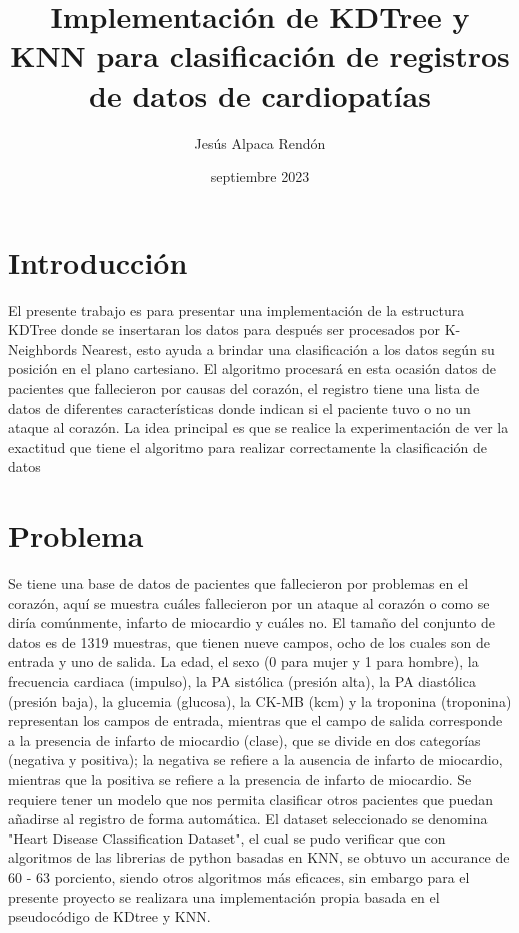 \documentclass[12pt]{article} %
\title{Implementación de KDTree y KNN para clasificación de registros de datos de cardiopatías}
\date{septiembre 2023}
\author{Jesús Alpaca Rendón}
\begin{document}
\maketitle
\section{Introducción}

El presente trabajo es para presentar una implementación de la estructura KDTree donde se insertaran los datos para después ser procesados
por K-Neighbords Nearest, esto ayuda a brindar una clasificación a los datos según su posición en el plano cartesiano. El algoritmo procesará
en esta ocasión datos de pacientes que fallecieron por causas del corazón, el registro tiene una lista de datos de diferentes características
donde indican si el paciente tuvo o no un ataque al corazón.
La idea principal es que se realice la experimentación de ver la exactitud que tiene el algoritmo para realizar correctamente la clasificación de datos

\section{Problema}

Se tiene una base de datos de pacientes que fallecieron por problemas en el corazón, aquí se muestra cuáles fallecieron por un ataque al corazón o como se diría comúnmente, infarto de miocardio y cuáles no.
El tamaño del conjunto de datos es de 1319 muestras, que tienen nueve campos, ocho de los cuales son de entrada y uno de salida. La edad,
el sexo (0 para mujer y 1 para hombre), la frecuencia cardiaca (impulso), la PA sistólica (presión alta), la PA diastólica (presión baja),
la glucemia (glucosa), la CK-MB (kcm) y la troponina (troponina) representan los campos de entrada, mientras que el campo de salida corresponde a la presencia
de infarto de miocardio (clase), que se divide en dos categorías (negativa y positiva); la negativa se refiere a la ausencia de infarto de miocardio, mientras que la positiva se refiere a la presencia de infarto de miocardio.
Se requiere tener un modelo que nos permita clasificar otros pacientes que puedan añadirse al registro de forma automática.
El dataset seleccionado se denomina "Heart Disease Classification Dataset", el cual se pudo verificar que con algoritmos de las librerias de python basadas en KNN, se obtuvo un accurance de 60 - 63 porciento, siendo otros algoritmos
más eficaces, sin embargo para el presente proyecto se realizara una implementación propia basada en el pseudocódigo de KDtree y KNN.
\end{document}
